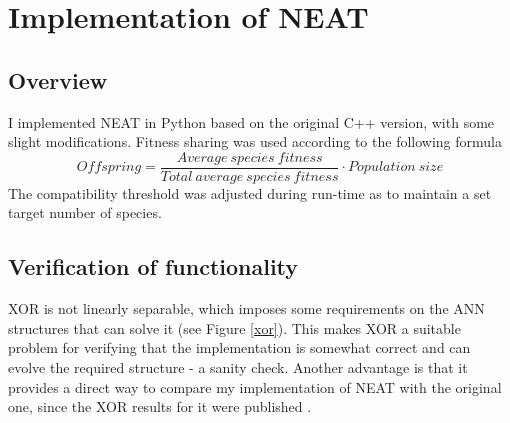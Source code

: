 \section{Implementation of NEAT}

\subsection{Overview}
I implemented NEAT in Python based on the original C++ version, with some slight modifications.
Fitness sharing was used according to the following formula
\begin{equation*} \label{eq:1}
    Offspring = \frac{Average\:species\:fitness}{Total\:average\:species\:fitness} \cdot Population\:size
\end{equation*}
The compatibility threshold was adjusted during run-time as to maintain a set target number of species.

\subsection{Verification of functionality}
XOR is not linearly separable, which imposes some requirements on the ANN structures that can solve it (see Figure \ref{xor}).
This makes XOR a suitable problem for verifying that the implementation is somewhat correct and can evolve
the required structure - a sanity check. Another advantage is that it provides a direct way to compare my
implementation of NEAT with the original one, since the XOR results for it were published \cite{neat_main}.


